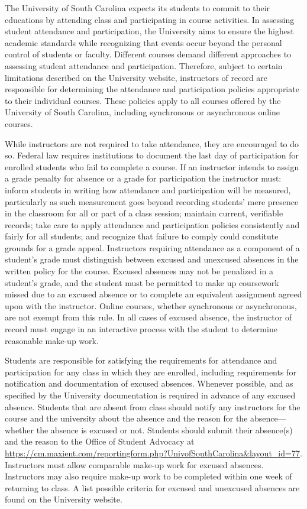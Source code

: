 \documentclass[11pt,letterpaper]{article}
\begin{document}

The University of South Carolina expects its students to commit to their educations by attending class and participating in course activities. In assessing student attendance and participation, the University aims to ensure the highest academic standards while recognizing that events occur beyond the personal control of students or faculty. Different courses demand different approaches to assessing student attendance and participation. Therefore, subject to certain limitations described on the University website, instructors of record are responsible for determining the attendance and participation policies appropriate to their individual courses. These policies apply to all courses offered by the University of South Carolina, including synchronous or asynchronous online courses. \pspace

While instructors are not required to take attendance, they are encouraged to do so. Federal law requires institutions to document the last day of participation for enrolled students who fail to complete a course. If an instructor intends to assign a grade penalty for absence or a grade for participation the instructor must: inform students in writing how attendance and participation will be measured, particularly as such measurement goes beyond recording students' mere presence in the classroom for all or part of a class session; maintain current, verifiable records; take care to apply attendance and participation policies consistently and fairly for all students; and recognize that failure to comply could constitute grounds for a grade appeal. Instructors requiring attendance as a component of a student’s grade must distinguish between excused and unexcused absences in the written policy for the course. Excused absences may not be penalized in a student’s grade, and the student must be permitted to make up coursework missed due to an excused absence or to complete an equivalent assignment agreed upon with the instructor. Online courses, whether synchronous or asynchronous, are not exempt from this rule. In all cases of excused absence, the instructor of record must engage in an interactive process with the student to determine reasonable make-up work. \pspace

Students are responsible for satisfying the requirements for attendance and participation for any class in which they are enrolled, including requirements for notification and documentation of excused absences. Whenever possible, and as specified by the University documentation is required in advance of any excused absence. Students that are absent from class should notify any instructors for the course and the university about the absence and the reason for the absence---whether the absence is excused or not. Students should submit their absence(s) and the reason to the Office of Student Advocacy at \url{https://cm.maxient.com/reportingform.php?UnivofSouthCarolina\&layout_id=77}. Instructors must allow comparable make-up work for excused absences. Instructors may also require make-up work to be completed within one week of returning to class. A list possible criteria for excused and unexcused absences are found on the University website. \pspace
\end{document}
